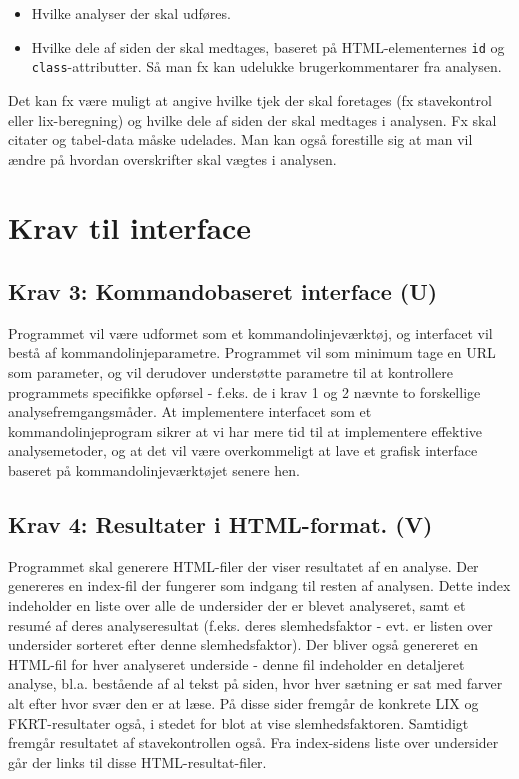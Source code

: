 \documentclass[a4paper,oneside,article]{memoir}
\begin{document}
\begin{itemize}
\item Hvilke analyser der skal udføres.
\item Hvilke dele af siden der skal medtages, baseret på
  HTML-elemen\-ter\-nes \texttt{id} og \texttt{class}-attributter. Så man
  fx kan udelukke brugerkommentarer fra analysen.
\end{itemize}

Det kan fx være muligt at angive hvilke tjek der skal foretages (fx
stavekontrol eller lix-beregning) og hvilke dele af siden der
skal medtages i analysen. Fx skal citater og tabel-data måske
udelades. Man kan også forestille sig at man vil ændre på hvordan
overskrifter skal vægtes i analysen. 

\section{Krav til interface}

\subsection{Krav 3: Kommandobaseret interface (U)}
Programmet vil være udformet som et kommandolinjeværktøj, og
interfacet vil bestå af kommandolinjeparametre. Programmet vil som
minimum tage en URL som parameter, og vil derudover understøtte
parametre til at kontrollere programmets specifikke opførsel -
f.eks. de i krav 1 og 2 nævnte to forskellige
analysefremgangsmåder. At implementere interfacet som et
kommandolinjeprogram sikrer at vi har mere tid til at implementere
effektive analysemetoder, og at det vil være overkommeligt at lave et
grafisk interface baseret på kommandolinjeværktøjet senere hen.

\subsection{Krav 4: Resultater i HTML-format. (V)}
Programmet skal generere HTML-filer der viser resultatet af en
analyse. Der genereres en index-fil der fungerer som indgang til
resten af analysen. Dette index indeholder en liste over alle de
undersider der er blevet analyseret, samt et resumé af deres
analyseresultat (f.eks. deres slemhedsfaktor - evt. er listen over
undersider sorteret efter denne slemhedsfaktor). Der bliver også
genereret en HTML-fil for hver analyseret underside - denne fil
indeholder en detaljeret analyse, bl.a. bestående af al tekst på
siden, hvor hver sætning er sat med farver alt efter hvor svær den er
at læse. På disse sider fremgår de konkrete LIX og FKRT-resultater
også, i stedet for blot at vise slemhedsfaktoren. Samtidigt fremgår
resultatet af stavekontrollen også. Fra index-sidens liste over
undersider går der links til disse HTML-resultat-filer.
\end{document}
